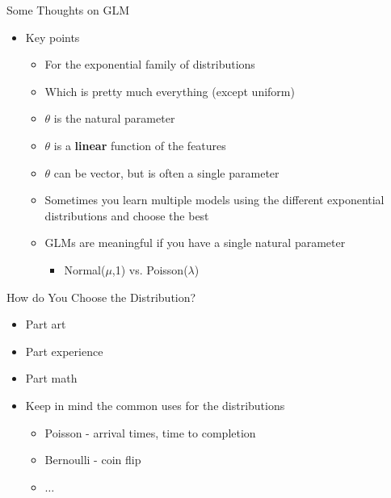 \documentclass[aspectratio=169]{beamer}
\begin{document}
\begin{frame}{Some Thoughts on GLM}

\begin{itemize}
\item Key points 
	\begin{itemize}
	\item For the exponential family of distributions
	\item Which is pretty much everything (except uniform)
	\item $\theta$ is the natural parameter
	\item $\theta$ is a \textbf{linear} function of the features
	\item $\theta$ can be vector, but is often a single parameter
	\item Sometimes you learn multiple models using the different exponential distributions and choose the best
	\item GLMs are meaningful if you have a single natural parameter
		\begin{itemize}
		\item Normal($\mu$,1) vs. Poisson($\lambda$)
		\end{itemize}
\end{itemize}
\end{itemize}
\end{frame}
\begin{frame}{How do You Choose the Distribution?}

\begin{itemize}
\item Part art
\item Part experience
\item Part math
\item Keep in mind the common uses for the distributions
\begin{itemize}
\item Poisson - arrival times, time to completion
\item Bernoulli - coin flip
\item $\ldots$
\end{itemize}
\end{itemize}
\end{frame}
\end{document}
